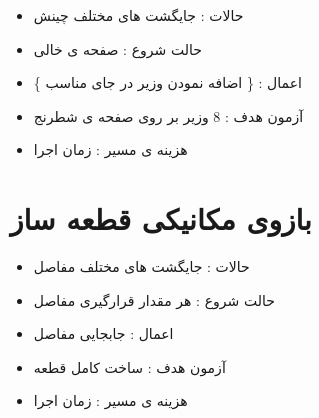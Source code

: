 \documentclass[12pt]{article}
\begin{document}
\begin{itemize}
	\item حالات : جایگشت های مختلف چینش
	\item حالت شروع : صفحه ی خالی
	\item اعمال :
	\{ اضافه نمودن وزیر در جای مناسب \}
	\item آزمون هدف : 8 وزیر بر روی صفحه ی شطرنج
	\item هزینه ی مسیر : زمان اجرا
\end{itemize}




\section{بازوی مکانیکی قطعه ساز}


\begin{itemize}
	\item حالات : جایگشت های مختلف مفاصل
	\item حالت شروع : هر مقدار قرارگیری مفاصل
	\item اعمال : جابجایی مفاصل
	\item آزمون هدف : ساخت کامل قطعه
	\item هزینه ی مسیر : زمان اجرا
\end{itemize}
\end{document}
